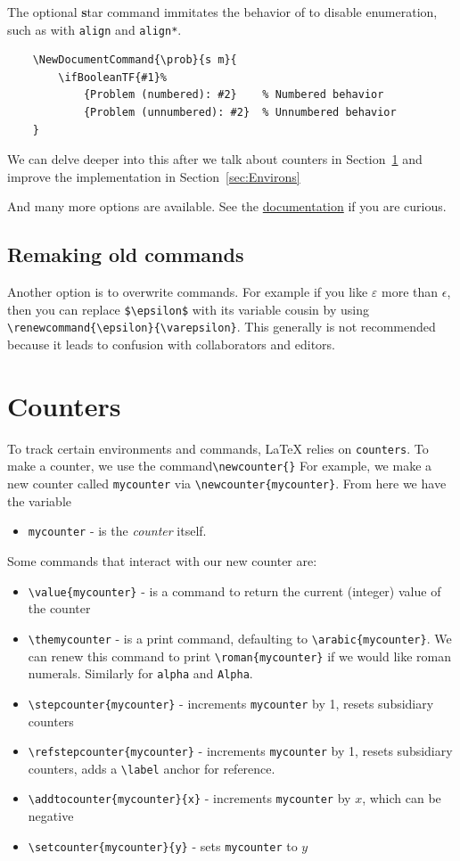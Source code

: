 \documentclass[]{article}
\begin{document}
\begin{example}
    The optional \textbf{s}tar command immitates the behavior of \* to disable enumeration, such as with \verb|align| and \verb|align*|.
\begin{verbatim}
    \NewDocumentCommand{\prob}{s m}{
        \ifBooleanTF{#1}%
            {Problem (numbered): #2}    % Numbered behavior
            {Problem (unnumbered): #2}  % Unnumbered behavior
    }
\end{verbatim}
We can delve deeper into this after we talk about counters in Section~\ref{sec:Counters} and improve the implementation in Section~\ref{sec:Environs}
\end{example}
And many more options are available. See the \href{https://texdoc.org/serve/usrguide/0}{documentation} if you are curious.

\subsection{Remaking old commands}
Another option is to overwrite commands. For example if you like $\varepsilon$ more than $\epsilon$, then you can replace \verb|$\epsilon$| with its variable cousin by using \verb|\renewcommand{\epsilon}{\varepsilon}|. This generally is not recommended because it leads to confusion with collaborators and editors.

\section{Counters}\label{sec:Counters}
To track certain environments and commands, LaTeX relies on \verb|counters|. To make a counter, we use the command\verb|\newcounter{}| For example, we make a new counter called \verb|mycounter| via \verb|\newcounter{mycounter}|. From here we have the variable
\begin{itemize}
    \item \verb|mycounter| - is the \emph{counter} itself.
\end{itemize}
Some commands that interact with our new counter are:
\begin{itemize}
    \item \verb|\value{mycounter}| - is a command to return the current (integer) value of the counter
    \item \verb|\themycounter| - is a print command, defaulting to \verb|\arabic{mycounter}|. We can renew this command to print \verb|\roman{mycounter}| if we would like roman numerals. Similarly for \verb|alpha| and \verb|Alpha|.
    \item \verb|\stepcounter{mycounter}| - increments \verb|mycounter| by 1, resets subsidiary counters
    \item \verb|\refstepcounter{mycounter}| - increments \verb|mycounter| by 1, resets subsidiary counters, adds a \verb|\label| anchor for reference.
    \item \verb|\addtocounter{mycounter}{x}| - increments \verb|mycounter| by $x$, which can be negative
    \item \verb|\setcounter{mycounter}{y}| - sets \verb|mycounter| to $y$
\end{itemize}
\end{document}
